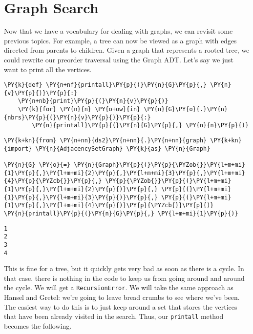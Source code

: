 \chapter{Graph Search}


Now that we have a vocabulary for dealing with graphs, we can revisit some previous topics.
For example, a tree can now be viewed as a graph with edges directed from parents to children.
Given a graph that represents a rooted tree, we could rewrite our preorder traversal using the Graph ADT.
Let's say we just want to print all the vertices.

\begin{Verbatim}[commandchars=\\\{\}]
\PY{k}{def} \PY{n+nf}{printall}\PY{p}{(}\PY{n}{G}\PY{p}{,} \PY{n}{v}\PY{p}{)}\PY{p}{:}
    \PY{n+nb}{print}\PY{p}{(}\PY{n}{v}\PY{p}{)}
    \PY{k}{for} \PY{n}{n} \PY{o+ow}{in} \PY{n}{G}\PY{o}{.}\PY{n}{nbrs}\PY{p}{(}\PY{n}{v}\PY{p}{)}\PY{p}{:}
        \PY{n}{printall}\PY{p}{(}\PY{n}{G}\PY{p}{,} \PY{n}{n}\PY{p}{)}
\end{Verbatim}



\begin{Verbatim}[commandchars=\\\{\}]
\PY{k+kn}{from} \PY{n+nn}{ds2}\PY{n+nn}{.}\PY{n+nn}{graph} \PY{k+kn}{import} \PY{n}{AdjacencySetGraph} \PY{k}{as} \PY{n}{Graph}

\PY{n}{G} \PY{o}{=} \PY{n}{Graph}\PY{p}{(}\PY{p}{\PYZob{}}\PY{l+m+mi}{1}\PY{p}{,}\PY{l+m+mi}{2}\PY{p}{,}\PY{l+m+mi}{3}\PY{p}{,}\PY{l+m+mi}{4}\PY{p}{\PYZcb{}}\PY{p}{,} \PY{p}{\PYZob{}}\PY{p}{(}\PY{l+m+mi}{1}\PY{p}{,}\PY{l+m+mi}{2}\PY{p}{)}\PY{p}{,} \PY{p}{(}\PY{l+m+mi}{1}\PY{p}{,}\PY{l+m+mi}{3}\PY{p}{)}\PY{p}{,} \PY{p}{(}\PY{l+m+mi}{1}\PY{p}{,}\PY{l+m+mi}{4}\PY{p}{)}\PY{p}{\PYZcb{}}\PY{p}{)}
\PY{n}{printall}\PY{p}{(}\PY{n}{G}\PY{p}{,} \PY{l+m+mi}{1}\PY{p}{)}
\end{Verbatim}

\begin{Verbatim}
1
2
3
4

\end{Verbatim}


This is fine for a tree, but it quickly gets very bad as soon as there is a cycle.
In that case, there is nothing in the code to keep us from going around and around the cycle.
We will get a \texttt{RecursionError}.
We will take the same approach as Hansel and Gretel: we're going to leave bread crumbs to see where we've been.
The easiest way to do this is to just keep around a set that stores the vertices that have been already visited in the search.
Thus, our \texttt{printall} method becomes the following.

